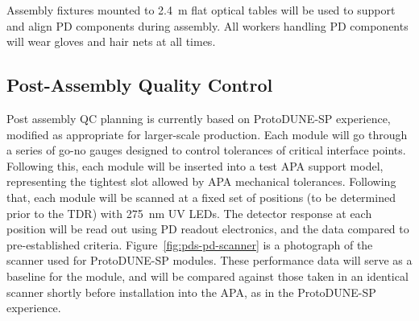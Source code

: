 Assembly fixtures mounted to \SI{2.4}{m} flat optical tables will be used to support and align PD components during assembly.  All workers handling PD components will wear gloves and hair nets at all times.






\subsection{Post-Assembly Quality Control}

Post assembly QC planning is currently based on ProtoDUNE-SP experience, modified as appropriate for larger-scale production.  Each module will go through a series of go-no gauges designed to control tolerances of critical interface points.  Following this, each module will be inserted into a test APA support model, representing the tightest slot allowed by APA mechanical tolerances.  Following that, each module will be scanned at a fixed set of positions (to be determined prior to the TDR) with \SI{275}{nm} UV LEDs.  The detector response at each position will be read out using PD readout electronics, and the data compared to pre-established criteria.  Figure~\ref{fig:pds-pd-scanner} is a photograph of the scanner used for ProtoDUNE-SP modules. These performance data will serve as a baseline for the module, and will be compared against those taken in an identical scanner shortly before installation into the APA, as in the ProtoDUNE-SP experience. 

